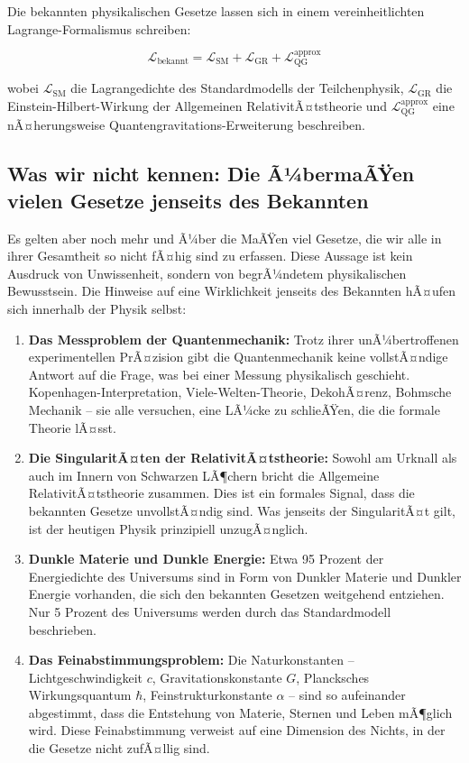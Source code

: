 ﻿\documentclass[12pt,a4paper]{report}
\begin{document}
Die bekannten physikalischen Gesetze lassen sich in einem vereinheitlichten Lagrange-Formalismus schreiben:

\begin{equation}
	\mathcal{L}_{\text{bekannt}} = \mathcal{L}_{\text{SM}} + \mathcal{L}_{\text{GR}} + \mathcal{L}_{\text{QG}}^{\text{approx}}
	\label{eq:lagrange_bekannt}
\end{equation}

wobei $\mathcal{L}_{\text{SM}}$ die Lagrangedichte des Standardmodells der Teilchenphysik, $\mathcal{L}_{\text{GR}}$ die Einstein-Hilbert-Wirkung der Allgemeinen RelativitÃ¤tstheorie und $\mathcal{L}_{\text{QG}}^{\text{approx}}$ eine nÃ¤herungs\-weise Quantengravitations-Erweiterung beschreiben.

\subsection{Was wir nicht kennen: Die Ã¼bermaÃŸen vielen Gesetze jenseits des Bekannten}

Es gelten aber noch mehr und Ã¼ber die MaÃŸen viel Gesetze, die wir alle in ihrer Gesamtheit so nicht fÃ¤hig sind zu erfassen. Diese Aussage ist kein Ausdruck von Unwissenheit, sondern von begrÃ¼ndetem physikalischen Bewusstsein. Die Hinweise auf eine Wirklichkeit jenseits des Bekannten hÃ¤ufen sich innerhalb der Physik selbst:

\begin{enumerate}
	\item \textbf{Das Messproblem der Quantenmechanik:} Trotz ihrer unÃ¼bertroffenen experimentellen PrÃ¤zision gibt die Quantenmechanik keine vollstÃ¤ndige Antwort auf die Frage, was bei einer Messung physikalisch geschieht. Kopenhagen-Interpretation, Viele-Welten-Theorie, DekohÃ¤renz, Bohmsche Mechanik -- sie alle versuchen, eine LÃ¼cke zu schlieÃŸen, die die formale Theorie lÃ¤sst.

	\item \textbf{Die SingularitÃ¤ten der RelativitÃ¤tstheorie:} Sowohl am Urknall als auch im Innern von Schwarzen LÃ¶chern bricht die Allgemeine RelativitÃ¤tstheorie zusammen. Dies ist ein formales Signal, dass die bekannten Gesetze unvollstÃ¤ndig sind. Was jenseits der SingularitÃ¤t gilt, ist der heutigen Physik prinzipiell unzugÃ¤nglich.

	\item \textbf{Dunkle Materie und Dunkle Energie:} Etwa 95 Prozent der Energiedichte des Universums sind in Form von Dunkler Materie und Dunkler Energie vorhanden, die sich den bekannten Gesetzen weitgehend entziehen. Nur 5 Prozent des Universums werden durch das Standardmodell beschrieben.

	\item \textbf{Das Feinabstimmungsproblem:} Die Naturkonstanten -- Lichtgeschwindigkeit $c$, Gravitationskonstante $G$, Plancksches Wirkungsquantum $\hbar$, Feinstrukturkonstante $\alpha$ -- sind so aufeinander abgestimmt, dass die Entstehung von Materie, Sternen und Leben mÃ¶glich wird. Diese Feinabstimmung verweist auf eine Dimension des Nichts, in der die Gesetze nicht zufÃ¤llig sind.
\end{enumerate}
\end{document}
